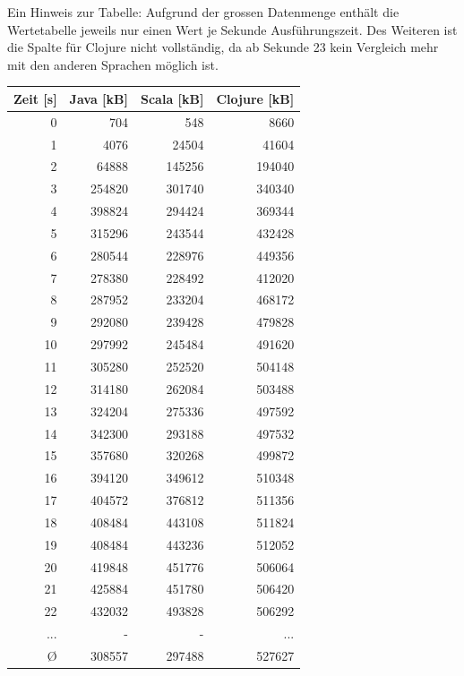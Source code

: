 \documentclass{fancydocument}
\begin{document}
\bigskip
\noindent
Ein Hinweis zur Tabelle: Aufgrund der grossen Datenmenge enthält die Wertetabelle jeweils nur einen Wert je Sekunde Ausführungszeit. Des Weiteren ist die Spalte für Clojure nicht vollständig, da ab Sekunde 23 kein Vergleich mehr mit den anderen Sprachen möglich ist.


\begin{center}
\begin{tabular}{|r|r|r|r|} \hline
\textbf{Zeit [s]} & \textbf{Java [kB]} & \textbf{Scala [kB]} & \textbf{Clojure [kB]}\\
\hline
0 & 704 & 548 & 8660\\
\hline
1 & 4076 & 24504 & 41604\\
\hline
2 & 64888 & 145256 & 194040\\
\hline
3 & 254820 & 301740 & 340340\\
\hline
4 & 398824 & 294424 & 369344\\
\hline
5 & 315296 & 243544 & 432428\\
\hline
6 & 280544 & 228976 & 449356\\
\hline
7 & 278380 & 228492 & 412020\\
\hline
8 & 287952 & 233204 & 468172\\
\hline
9 & 292080 & 239428 & 479828\\
\hline
10 & 297992 & 245484 & 491620\\
\hline
11 & 305280 & 252520 & 504148\\
\hline
12 & 314180 & 262084 & 503488\\
\hline
13 & 324204 & 275336 & 497592\\
\hline
14 & 342300 & 293188 & 497532\\
\hline
15 & 357680 & 320268 & 499872\\
\hline
16 & 394120 & 349612 & 510348\\
\hline
17 & 404572 & 376812 & 511356\\
\hline
18 & 408484 & 443108 & 511824\\
\hline
19 & 408484 & 443236 & 512052\\
\hline
20 & 419848 & 451776 & 506064\\
\hline
21 & 425884 & 451780 & 506420\\
\hline
22 & 432032 & 493828 & 506292\\
\hline
... & - & - & ...\\
\hline
Ø & 308557 & 297488 & 527627\\
\hline
\end{tabular}


\end{center}
\end{document}
